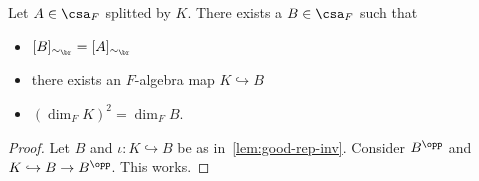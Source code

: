  \begin{corollary}\label{cor:good-rep}
   Let $A\in\csa_{F}$ splitted by $K$. There exists a $B \in \csa_{F}$ such that
   \begin{itemize}
     \item $[B]_{\sim_{\br}}=[A]_{\sim_{\br}}$
     \item there exists an $F$-algebra map $K\hookrightarrow B$
     \item  ${\left(\dim_{F}K\right)}^{2}=\dim_{F}B$.
   \end{itemize}
 \end{corollary}

 \begin{proof}
   Let $B$ and $\iota : K \hookrightarrow B$ be as in~\cref{lem:good-rep-inv}. Consider $B^{\opp}$ and $K \hookrightarrow B \to B^{\opp}$. This works.
 \end{proof}

